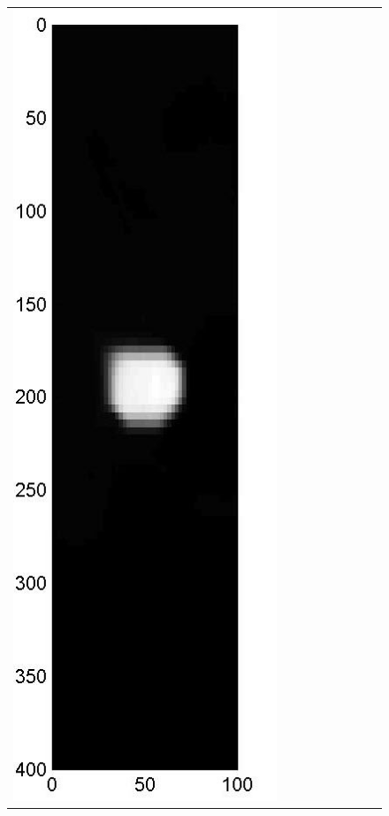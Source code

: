 \documentclass[english]{siamltex}
\begin{document}
{\begin{figure}[!h]
\begin{center}
\begin{tabular}{|c|c|c|c|c|c|c|c|c|}
			\includegraphics[width=.9\iwidth]{figures/newFigs/noisy/resultsExp-4-mkTV}
			&

\end{tabular}
\end{center}
\end{figure}}
\end{document}
